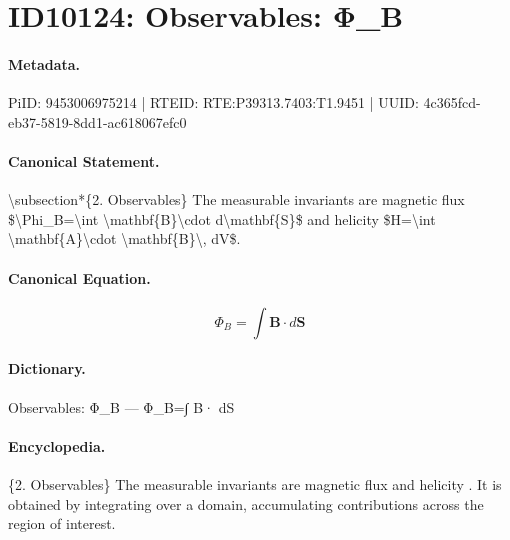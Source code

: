 \section*{ID10124: Observables: Φ\_B}
\paragraph{Metadata.}
PiID: 9453006975214 | RTEID: RTE:P39313.7403:T1.9451 | UUID: 4c365fcd-eb37-5819-8dd1-ac618067efc0

\paragraph{Canonical Statement.}
\textbackslash{}subsection*\{2. Observables\} The measurable invariants are magnetic flux \$\textbackslash{}Phi\_B=\textbackslash{}int \textbackslash{}mathbf\{B\}\textbackslash{}cdot d\textbackslash{}mathbf\{S\}\$ and helicity \$H=\textbackslash{}int \textbackslash{}mathbf\{A\}\textbackslash{}cdot \textbackslash{}mathbf\{B\}\textbackslash{}, dV\$.

\paragraph{Canonical Equation.}
\[
\Phi_B=\int \mathbf{B}\cdot d\mathbf{S}
\]

\paragraph{Dictionary.}
Observables: Φ\_B — Φ\_B=∫ B· dS

\paragraph{Encyclopedia.}
\{2. Observables\} The measurable invariants are magnetic flux and helicity . It is obtained by integrating over a domain, accumulating contributions across the region of interest.
